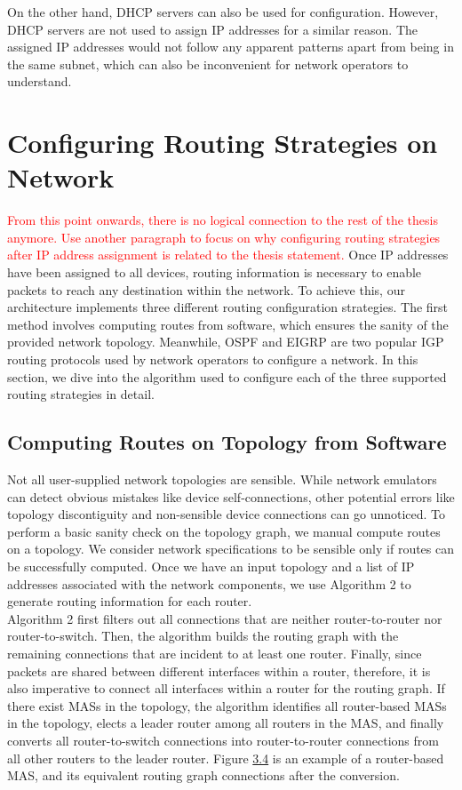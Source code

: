 \documentclass{uiucthesis2021}
\begin{document}
\noindent On the other hand, DHCP servers can also be used for configuration. However, DHCP servers are not used to assign IP addresses for a similar reason. The assigned IP addresses would not follow any apparent patterns apart from being in the same subnet, which can also be inconvenient for network operators to understand.

\label{s34}
\section{Configuring Routing Strategies on Network}
\noindent \textcolor{red}{From this point onwards, there is no logical connection to the rest of the thesis anymore. Use another paragraph to focus on why configuring routing strategies after IP address assignment is related to the thesis statement.} Once IP addresses have been assigned to all devices, routing information is necessary to enable packets to reach any destination within the network. To achieve this, our architecture implements three different routing configuration strategies. The first method involves computing routes from software, which ensures the sanity of the provided network topology. Meanwhile, OSPF and EIGRP are two popular IGP routing protocols used by network operators to configure a network. In this section, we dive into the algorithm used to configure each of the three supported routing strategies in detail. \\

\label{s341}
\subsection{Computing Routes on Topology from Software}
\noindent Not all user-supplied network topologies are sensible. While network emulators can detect obvious mistakes like device self-connections, other potential errors like topology discontiguity and non-sensible device connections can go unnoticed. To perform a basic sanity check on the topology graph, we manual compute routes on a topology. We consider network specifications to be sensible only if routes can be successfully computed. Once we have an input topology and a list of IP addresses associated with the network components, we use Algorithm 2 to generate routing information for each router. \\

\noindent Algorithm 2 first filters out all connections that are neither router-to-router nor router-to-switch. Then, the algorithm builds the routing graph with the remaining connections that are incident to at least one router. Finally, since packets are shared between different interfaces within a router, therefore, it is also imperative to connect all interfaces within a router for the routing graph. If there exist MASs in the topology, the algorithm identifies all router-based MASs in the topology, elects a leader router among all routers in the MAS, and finally converts all router-to-switch connections into router-to-router connections from all other routers to the leader router. Figure \hyperref[f34]{3.4} is an example of a router-based MAS, and its equivalent routing graph connections after the conversion.\\
\end{document}
